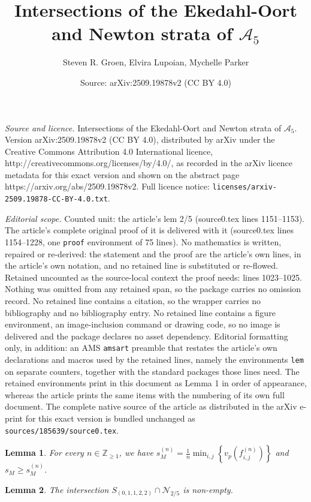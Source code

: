 \documentclass[10pt,a4paper]{amsart}
\title{Intersections of the Ekedahl-Oort and Newton strata of $\mathcal{A}_{5}$}
\author{Steven R. Groen, Elvira Lupoian, Mychelle Parker}
\date{Source: arXiv:2509.19878v2 (CC BY 4.0)}
\newtheorem{lem}{Lemma}
\begin{document}
\maketitle

\noindent\emph{Source and licence.} Intersections of the Ekedahl-Oort and Newton strata of $\mathcal{A}_{5}$. Version arXiv:2509.19878v2 (CC BY 4.0), distributed by arXiv under the Creative Commons Attribution 4.0 International licence, http://creativecommons.org/licenses/by/4.0/, as recorded in the arXiv licence metadata for this exact version and shown on the abstract page https://arxiv.org/abs/2509.19878v2. Full licence notice: \texttt{licenses/arxiv-2509.19878-CC-BY-4.0.txt}.\par\smallskip

\noindent\textit{Editorial scope.} Counted unit: the article's lem 2/5 (source0.tex lines 1151--1153). The article's complete original proof of it is delivered with it (source0.tex lines 1154--1228, one \texttt{proof} environment of 75 lines). No mathematics is written, repaired or re-derived: the statement and the proof are the article's own lines, in the article's own notation, and no retained line is substituted or re-flowed.  Retained uncounted as the source-local context the proof needs: lines 1023--1025.  Nothing was omitted from any retained span, so the package carries no omission record.  No retained line contains a citation, so the wrapper carries no bibliography and no bibliography entry.  No retained line contains a figure environment, an image-inclusion command or drawing code, so no image is delivered and the package declares no asset dependency.  Editorial formatting only, in addition: an AMS \texttt{amsart} preamble that restates the article's own declarations and macros used by the retained lines, namely the environments \texttt{lem} on separate counters, together with the standard packages those lines need.  The retained environments print in this document as Lemma 1 in order of appearance, whereas the article prints the same items with the numbering of its own full document.  The complete native source of the article as distributed in the arXiv e-print for this exact version is bundled unchanged as \texttt{sources/185639/source0.tex}.
\begin{lem} \label{lem: Zink+} 
For every $n\in \mathbb{Z}_{\geq 1}$, we have $s_M^{(n)} = \frac{1}{n}\min_{i,j} \left\{v_p\left(f_{i,j}^{(n)}\right)\right\}$ and $s_M \geq s_M^{(n)}$.
\end{lem}

\begin{lem} \label{lem: (0,1,1,2,2) with 2/5}
The intersection $S_{(0,1,1,2,2)} \cap \mathcal{N}_{2/5}$ is non-empty.
\end{lem}
\end{document}
